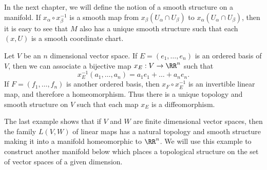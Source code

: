 \begin{remark}
	In the next chapter, we will define the notion of a smooth structure on a manifold. If $x_\alpha \circ x_\beta^{-1}$ is a smooth map from $x_\beta(U_\alpha \cap U_\beta)$ to $x_\alpha(U_\alpha \cap U_\beta)$, then it is easy to see that $M$ also has a unique smooth structure such that each $(x,U)$ is a smooth coordinate chart.
\end{remark}

\begin{example}
    Let $V$ be an $n$ dimensional vector space. If $E = (e_1, \dots, e_n)$ is an ordered basis of $V$, then we can associate a bijective map $x_E: V \to \RR^n$ such that
    \[ x_E^{-1}(a_1, \dots, a_n) = a_1e_1 + \dots + a_ne_n. \]
    If $F = (f_1, \dots, f_n)$ is another ordered basis, then $x_F \circ x_E^{-1}$ is an invertible linear map, and therefore a homeomorphism. Thus there is a unique topology and smooth structure on $V$ such that each map $x_E$ is a diffeomorphism.
\end{example}

The last example shows that if $V$ and $W$ are finite dimensional vector spaces, then the family $L(V,W)$ of linear maps has a natural topology and smooth structure making it into a manifold homeomorphic to $\RR^n$. We will use this example to construct another manifold below which places a topological structure on the set of vector spaces of a given dimension.

